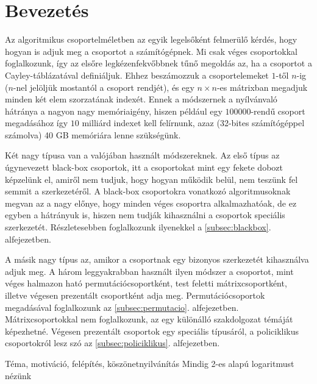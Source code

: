\section*{Bevezetés}
\label{sec:bevezetes}
Az algoritmikus csoportelméletben az egyik legelsőként felmerülő kérdés, hogy hogyan is adjuk meg
a csoportot a számítógépnek.
Mi csak véges csoportokkal foglalkozunk, így az elsőre legkézenfekvőbbnek tűnő megoldás az, ha a
csoportot a Cayley-táblázatával definiáljuk.
Ehhez beszámozzuk a csoportelemeket $1$-től $n$-ig ($n$-nel jelöljük mostantól a csoport rendjét),
és egy $n\times n$-es mátrixban megadjuk minden két elem szorzatának indexét.
Ennek a módszernek a nyílvánvaló hátránya a nagyon nagy memóriaigény,
hiszen például egy $100000$-rendű csoport megadásához így $10$ milliárd indexet kell felírnunk,
azaz (32-bites számítógéppel számolva) 40 GB memóriára lenne szükségünk.

Két nagy típusa van a valójában használt módszereknek.
Az első típus az úgynevezett black-box csoportok, itt a csoportokat mint egy fekete dobozt képzelünk el,
amiről nem tudjuk, hogy hogyan működik belül, nem teszünk fel semmit a szerkezetéről.
A black-box csoportokra vonatkozó algoritmusoknak megvan az a nagy előnye, hogy minden véges csoportra
alkalmazhatóak, de ez egyben a hátrányuk is, hiszen nem tudják kihasználni a csoportok speciális szerkezetét.
Részletesebben foglalkozunk ilyenekkel a \ref{subsec:blackbox}. alfejezetben.

A másik nagy típus az, amikor a csoportnak egy bizonyos szerkezetét kihasználva adjuk meg.
A három leggyakrabban használt ilyen módszer a csoportot, mint véges halmazon ható permutációcsoportként,
test feletti mátrixcsoportként, illetve végesen prezentált csoportként adja meg.
Permutációcsoportok megadásával foglalkozunk az \ref{subsec:permutacio}. alfejezetben.
Mátrixcsoportokkal nem foglalkozunk, az egy különálló szakdolgozat témáját képezhetné.
Végesen prezentált csoportok egy speciális típusáról, a policiklikus csoportokról lesz szó
az \ref{subsec:policiklikus}. alfejezetben.

\cite{HEO05}
Téma, motiváció, felépítés, köszönetnyilvánítás
Mindig 2-es alapú logaritmust nézünk

